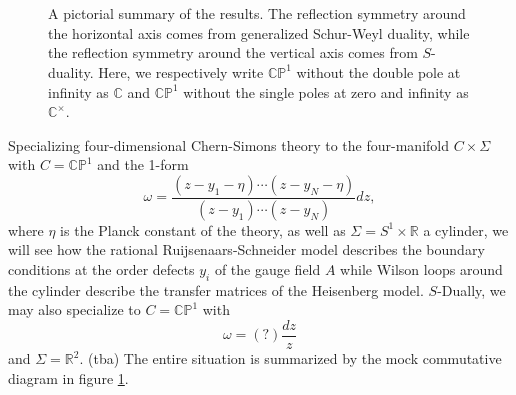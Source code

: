 \documentclass[11pt]{report}
\theoremstyle{definition}
\theoremstyle{remark}
\theoremstyle{remark}
\newcommand{\R}{\mathbb{R}}
\newcommand{\C}{\mathbb{C}}
\newcommand{\CP}{\mathbb{CP}}
\begin{document}
\begin{figure}
\begin{center}
~\\~\\
\end{center}
\caption{A pictorial summary of the results. The reflection symmetry around the horizontal axis comes from generalized Schur-Weyl duality, while the reflection symmetry around the vertical axis comes from $S$-duality. Here, we respectively write $\CP^1$ without the double pole at infinity as $\C$ and $\CP^1$ without the single poles at zero and infinity as $\C^\times$.}
\label{figure:dualities}
\end{figure}

Specializing four-dimensional Chern-Simons theory to the four-manifold $C \times \Sigma$ with $C = \CP^1$ and the 1-form
\begin{equation*}
\omega = \frac{(z-y_1-\eta) \cdots (z-y_N-\eta)}{(z-y_1) \cdots (z-y_N)} dz,
\end{equation*}
where $\eta$ is the Planck constant of the theory, as well as $\Sigma = S^1 \times \R$ a cylinder, we will see how the rational Ruijsenaars-Schneider model describes the boundary conditions at the order defects $y_i$ of the gauge field $A$ while Wilson loops around the cylinder describe the transfer matrices of the Heisenberg model. $S$-Dually, we may also specialize to $C = \CP^1$ with
\begin{equation*}
\omega = (?) \frac{dz}{z}
\end{equation*}
and $\Sigma = \R^2$. (tba) The entire situation is summarized by the mock commutative diagram in figure \ref{figure:dualities}.
\end{document}
